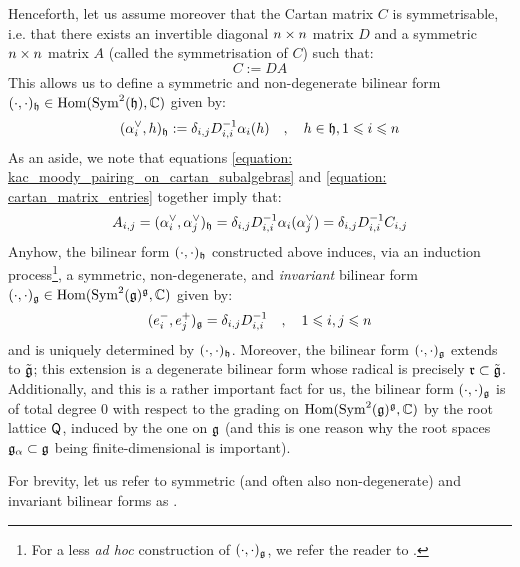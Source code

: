Henceforth, let us assume moreover that the Cartan matrix $C$ is symmetrisable, i.e. that there exists an invertible diagonal $n \x n$ matrix $D$ and a symmetric $n \x n$ matrix $A$ (called the symmetrisation of $C$) such that:
    \begin{equation} \label{equation: symmetrising_cartan_matrices}
        C := DA
    \end{equation}
This allows us to define a symmetric and non-degenerate bilinear form $(\cdot, \cdot)_{\mathfrak{h}} \in \operatorname{Hom}( \operatorname{Sym}^2(\mathfrak{h}), \mathbb{C} )$ given by:
    \begin{equation} \label{equation: kac_moody_pairing_on_cartan_subalgebras}
        ( \alpha_i^{\vee}, h )_{\mathfrak{h}} := \delta_{i, j} D_{i, i}^{-1} \alpha_i(h) \quad, \quad h \in \mathfrak{h}, 1 \leqslant i \leqslant n
    \end{equation}
As an aside, we note that equations \eqref{equation: kac_moody_pairing_on_cartan_subalgebras} and \eqref{equation: cartan_matrix_entries} together imply that:
    $$A_{i, j} = (\alpha_i^{\vee}, \alpha_j^{\vee})_{\mathfrak{h}} = \delta_{i, j} D_{i, i}^{-1} \alpha_i( \alpha_j^{\vee} ) = \delta_{i, j} D_{i, i}^{-1} C_{i, j}$$
Anyhow, the bilinear form $(\cdot, \cdot)_{\mathfrak{h}}$ constructed above induces, via an induction process\footnote{For a less \textit{ad hoc} construction of $(\cdot, \cdot)_{\mathfrak{g}}$, we refer the reader to \cite{neher_pianzola_prelat_sepp_invariant_bilinear_forms_via_fppf_descent}.}, a symmetric, non-degenerate, and \textit{invariant} bilinear form $(\cdot, \cdot)_{\mathfrak{g}} \in \operatorname{Hom}( \operatorname{Sym}^2(\mathfrak{g})^{\mathfrak{g}}, \mathbb{C} )$ given by:
    \begin{equation} \label{equation: kac_moody_pairing}
        ( e_i^-, e_j^+ )_{\mathfrak{g}} = \delta_{i, j} D_{i, i}^{-1} \quad, \quad 1 \leqslant i, j \leqslant n
    \end{equation}
and is uniquely determined by $(\cdot, \cdot)_{\mathfrak{h}}$. Moreover, the bilinear form $(\cdot, \cdot)_{\mathfrak{g}}$ extends to $\tilde{\mathfrak{g}}$; this extension is a degenerate bilinear form whose radical is precisely $\mathfrak{r} \subset \tilde{\mathfrak{g}}$. Additionally, and this is a rather important fact for us, the bilinear form $(\cdot, \cdot)_{\mathfrak{g}}$ is of total degree $0$ with respect to the grading on $\operatorname{Hom}( \operatorname{Sym}^2(\mathfrak{g})^{\mathfrak{g}}, \mathbb{C} )$ by the root lattice $\mathsf{Q}$, induced by the one on $\mathfrak{g}$ (and this is one reason why the root spaces $\mathfrak{g}_{\alpha} \subset \mathfrak{g}$ being finite-dimensional is important).
\begin{convention}
    For brevity, let us refer to symmetric (and often also non-degenerate) and invariant bilinear forms as .
\end{convention}

